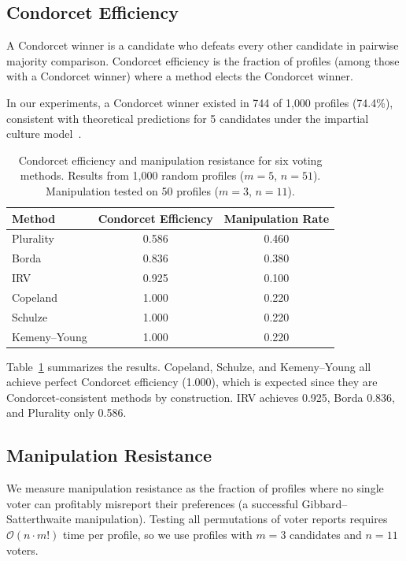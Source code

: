 \documentclass[10pt]{article}
\begin{document}
\subsection{Condorcet Efficiency}

A Condorcet winner is a candidate who defeats every other candidate in pairwise majority comparison. Condorcet efficiency is the fraction of profiles (among those with a Condorcet winner) where a method elects the Condorcet winner.

In our experiments, a Condorcet winner existed in 744 of 1{,}000 profiles (74.4\%), consistent with theoretical predictions for 5 candidates under the impartial culture model~\citep{gehrlein2006condorcet}.

\begin{table}[t]
\centering
\caption{Condorcet efficiency and manipulation resistance for six voting methods. Results from 1{,}000 random profiles ($m=5$, $n=51$). Manipulation tested on 50 profiles ($m=3$, $n=11$).}
\label{tab:voting}
\begin{tabular}{lcc}
\toprule
\textbf{Method} & \textbf{Condorcet Efficiency} & \textbf{Manipulation Rate} \\
\midrule
Plurality     & 0.586 & 0.460 \\
Borda         & 0.836 & 0.380 \\
IRV           & 0.925 & 0.100 \\
Copeland      & 1.000 & 0.220 \\
Schulze       & 1.000 & 0.220 \\
Kemeny--Young & 1.000 & 0.220 \\
\bottomrule
\end{tabular}
\end{table}

Table~\ref{tab:voting} summarizes the results. Copeland, Schulze, and Kemeny--Young all achieve perfect Condorcet efficiency (1.000), which is expected since they are Condorcet-consistent methods by construction. IRV achieves 0.925, Borda 0.836, and Plurality only 0.586.

\subsection{Manipulation Resistance}

We measure manipulation resistance as the fraction of profiles where no single voter can profitably misreport their preferences (a successful Gibbard--Satterthwaite manipulation). Testing all permutations of voter reports requires $\mathcal{O}(n \cdot m!)$ time per profile, so we use profiles with $m=3$ candidates and $n=11$ voters.
\end{document}
